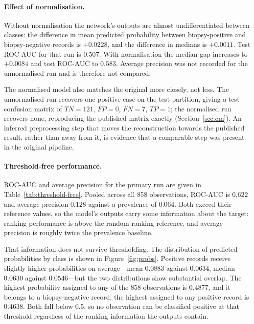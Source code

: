 \paragraph{Effect of normalisation.} Without normalisation the network's
outputs are almost undifferentiated between classes: the difference in mean
predicted probability between biopsy-positive and biopsy-negative records is
$+0.0228$, and the difference in medians is $+0.0011$. Test ROC-AUC for that
run is $0.507$. With normalisation the median gap increases to $+0.0084$ and
test ROC-AUC to $0.583$. Average precision was not recorded for the
unnormalised run and is therefore not compared.

The normalised model also matches the original more closely, not less. The
unnormalised run recovers one positive case on the test partition, giving a
test confusion matrix of $TN=121$, $FP=0$, $FN=7$, $TP=1$; the normalised run
recovers none, reproducing the published matrix exactly
(Section~\ref{sec:cm}). An inferred preprocessing step that moves the
reconstruction towards the published result, rather than away from it, is
evidence that a comparable step was present in the original pipeline.

\paragraph{Threshold-free performance.} ROC-AUC and average precision for the
primary run are given in Table~\ref{tab:threshold-free}. Pooled across all 858
observations, ROC-AUC is $0.622$ and average precision $0.128$ against a
prevalence of $0.064$. Both exceed their reference values, so the model's
outputs carry some information about the target: ranking performance is above
the random-ranking reference, and average precision is roughly twice the
prevalence baseline.

That information does not survive thresholding. The distribution of predicted
probabilities by class is shown in Figure~\ref{fig:probs}. Positive records
receive slightly higher probabilities on average---mean $0.0883$ against
$0.0634$, median $0.0630$ against $0.0546$---but the two distributions show
substantial overlap. The highest probability assigned to any of the 858
observations is $0.4877$, and it belongs to a biopsy-negative record; the
highest assigned to any positive record is $0.4638$. Both fall below $0.5$, so
no observation can be classified positive at that threshold regardless of the
ranking information the outputs contain.

